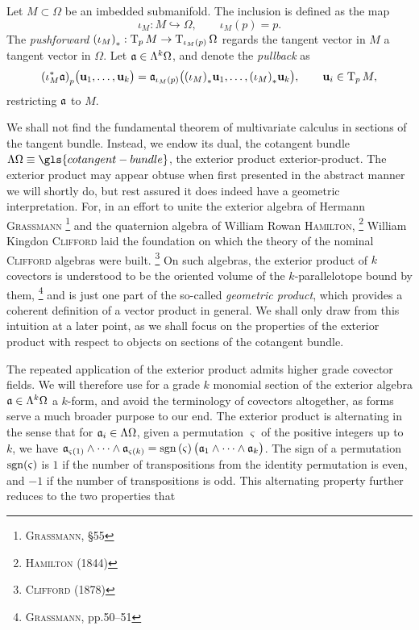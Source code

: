 \begin{definition}
  Let $M \subset \Omega$ be an imbedded submanifold.
  The inclusion is defined as the map
  \begin{equation}
    \iota_{M} : M \hookrightarrow \Omega, \qquad \iota_{M}(p) = p.
  \end{equation}
  The \emph{pushforward} ${(\iota_{M})}_{\ast}: \operatorname{T}_p M \to \operatorname{T}_{\iota_{M}(p)} \Omega$ regards the tangent vector in $M$ a tangent vector in $\Omega$.
  Let $\mathfrak{a} \in \Lambda^k \Omega$, and denote the \emph{pullback} as
  \begin{equation}
    {(\iota_{M}^{\ast} \mathfrak{a})}_p \big( \mathbf{u}_1, \dots, \mathbf{u}_k \big) = \mathfrak{a}_{\iota_{M}(p)} \big( {(\iota_M)}_{\ast} \mathbf{u}_1, \dots, {(\iota_M)}_{\ast} \mathbf{u}_k \big), \qquad \mathbf{u}_i \in \operatorname{T}_p M,
  \end{equation}
  restricting $\mathfrak{a}$ to $M$.
\end{definition}

\noindent
We shall not find the fundamental theorem of multivariate calculus in sections of the tangent bundle.
Instead, we endow its dual, the cotangent bundle $\Lambda\Omega \equiv \gls{cotangent-bundle}$, the exterior product \gls{exterior-product}.
The exterior product may appear obtuse when first presented in the abstract manner we will shortly do, but rest assured it does indeed have a geometric interpretation.
For, in an effort to unite the exterior algebra of Hermann \textsc{Grassmann}%
\footnote{%
  \cite{grassmann1878lineale} \textsc{Grassmann}, \S55
}
and the quaternion algebra of William Rowan \textsc{Hamilton},%
\footnote{%
  \cite{hamilton1844quaternions} \textsc{Hamilton} (1844)
}
William Kingdon \textsc{Clifford} laid the foundation on which the theory of the nominal \textsc{Clifford} algebras were built.%
\footnote{%
  \cite{clifford1878applications} \textsc{Clifford} (1878)
}
On such algebras, the exterior product of $k$ covectors is understood to be the oriented volume of the $k$-parallelotope bound by them,%
\footnote{%
  \cite{grassmann1878lineale} \textsc{Grassmann}, pp.50--51
}
and is just one part of the so-called \emph{geometric product}, which provides a coherent definition of a vector product in general.
We shall only draw from this intuition at a later point, as we shall focus on the properties of the exterior product with respect to objects on sections of the cotangent bundle.

The repeated application of the exterior product admits higher grade covector fields.
We will therefore use for a grade $k$ monomial section of the exterior algebra $\mathfrak{a} \in \Lambda^{k}\Omega$ a $k$-form, and avoid the terminology of covectors altogether, as forms serve a much broader purpose to our end.
The exterior product is alternating in the sense that for $\mathfrak{a}_i \in \Lambda\Omega$, given a permutation $\varsigma$ of the positive integers up to $k$, we have $\mathfrak{a}_{\varsigma(1)}\wedge\cdots\wedge\mathfrak{a}_{\varsigma(k)} = \operatorname{sgn}{(\varsigma)} \, \big( \mathfrak{a}_{1}\wedge\cdots\wedge\mathfrak{a}_{k} \big)$.
The sign of a permutation $\operatorname{sgn}(\varsigma)$ is $1$ if the number of transpositions from the identity permutation is even, and $-1$ if the number of transpositions is odd.
This alternating property further reduces to the two properties that

